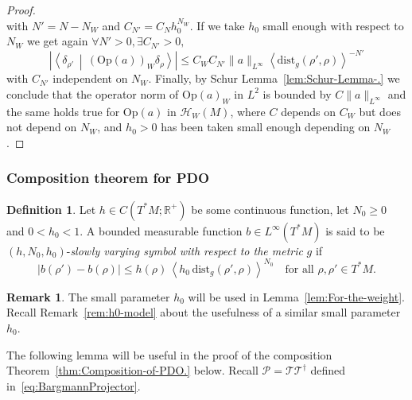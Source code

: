 \documentclass[10pt]{amsart}
\theoremstyle{definition}\newtheorem{defi}[theo]{Definition}\newtheorem{rema}[theo]{Remark}\newtheorem{exam}[theo]{Example}\newtheorem{exem}[theo]{Example}\newtheorem{nota}[theo]{Notation}
\newcommand{\clT}{\mathcal{T}}
\newcommand{\clH}{\mathcal{H}}
\newcommand{\clP}{\mathcal{P}}
\newcommand{\dist}{\mathrm{dist}}
\newcommand{\Opp}{\mathrm{Op}}
\newcommand{\bbR}{\mathbb{R}}
\let\oldexists\exists
\renewcommand*{\exists}{\mathrel{\oldexists}}
\let\oldforall\forall
\renewcommand*{\forall}{\mathrel{\oldforall}}
\begin{document}
\begin{proof}
\begin{equation}
\end{equation}
with $N'=N-N_{W}$ and $C_{N'}=C_{N}h_{0}^{N_{W}}$. If we take $h_{0}$ small enough with respect to $N_{W}$ we get again $\forall N'>0,\exists C_{N'}>0,$
\[
\left|\left\langle\delta_{\rho'}\,\middle|\,\left(\Opp \left(a\right)\right)_{W}\delta_{\rho}\right\rangle\right|\leq C_{W}C_{N'}\|a\|_{L^{\infty}}\left\langle \dist_{g}\left(\rho',\rho\right)\right\rangle ^{-N'}
\]
with $C_{N'}$ independent on $N_{W}$. Finally, by Schur Lemma~\ref{lem:Schur-Lemma-.} we conclude that the operator norm of $\Opp (a)_{W}$ in $L^{2}$ is bounded by $C\|a\|_{L^{\infty}}$ and the same holds true for $\Opp (a)$ in $\clH _{W}(M)$, where $C$ depends on $C_{W}$ but does not depend on $N_{W}$, and $h_{0}>0$ has been taken small enough depending on $N_{W}$.
\end{proof}

\subsubsection{Composition theorem for PDO}

\begin{cBoxA}{}
\begin{defi}\label{def:Let--be}
Let $h\in C(T^{*}M;\bbR^{+})$ be some continuous function, let $N_{0}\geq0$ and $0<h_{0}<1$. A bounded measurable function $b\in L^{\infty}(T^{*}M)$ is said to be $(h,N_{0},h_{0})$-\emph{slowly varying symbol with respect to the metric} $g$ if
\begin{equation}\label{eq:slow_variations}
\left|b\left(\rho'\right)-b\left(\rho\right)\right|\leq h\left(\rho\right)\,\left\langle h_{0}\,\dist_{g}\left(\rho',\rho\right)\right\rangle ^{N_{0}}\quad\text{for all }\rho,\rho'\in T^{*}M.
\end{equation}
\end{defi}
\end{cBoxA}

\begin{rema}
The small parameter $h_{0}$ will be used in Lemma~\ref{lem:For-the-weight}. Recall Remark~\ref{rem:h0-model} about the usefulness of a similar small parameter $h_{0}$.
\end{rema}

The following lemma will be useful in the proof of the composition Theorem~\ref{thm:Composition-of-PDO.} below. Recall $\clP =\clT\clT^{\dagger}$ defined in~\eqref{eq:BargmannProjector}.
\end{document}
